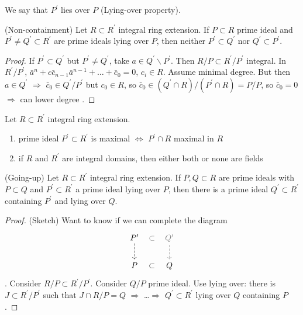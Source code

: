 \documentclass[a4paper,11pt]{article}
\begin{document}
			We say that $P^\prime$ lies over $P$ (Lying-over property).

			\begin{prop}(Non-containment)
				Let $R\subset R^\prime$ integral ring extension. If $P\subset R$ prime ideal and $P^\prime\neq Q^\prime\subset R^\prime$ are prime ideals lying over $P$, then neither $P^\prime\subset Q^\prime$ nor $Q^\prime\subset P^\prime$.
			\end{prop}
			\begin{proof}
				If $P^\prime\subset Q^\prime$ but $P^\prime\neq Q^\prime$, take $a\in Q^\prime\backslash P^\prime$. Then $R/P\subset R^\prime/P^\prime$ integral. In $R^\prime/P^\prime$, $\bar{a}^n+c\bar{c}_{n-1}\bar{a}^{n-1}+\dots+\bar{c}_0=0$, $c_i\in R$. Assume minimal degree. But then $a\in Q^\prime$ $\Longrightarrow$ $\bar{c}_0\in Q^\prime/P^\prime$ but $c_0\in R$, so $\bar{c}_0\in(Q^\prime\cap R)/(P^\prime\cap R)=P/P$, so $\bar{c}_0=0$ $\Longrightarrow$ can lower degree \contradiction.
			\end{proof}

			\begin{cor}
				Let $R\subset R^\prime$ integral ring extension.
				\begin{enumerate}
					\item prime ideal $P^\prime\subset R^\prime$ is maximal $\Longleftrightarrow$ $P^\prime\cap R$ maximal in $R$
					\item if $R$ and $R^\prime$ are integral domains, then either both or none are fields
				\end{enumerate}
			\end{cor}

			\begin{prop}\label{prop--existq}(Going-up)
				Let $R\subset R^\prime$ integral ring extension. If $P,Q\subset R$ are prime ideals with $P\subset Q$ and $P^\prime\subset R^\prime$ a prime ideal lying over $P$, then there is a prime ideal $Q^\prime\subset R^\prime$ containing $P^\prime $ and lying over $Q$.
			\end{prop}
			\begin{proof}\renewcommand{\qedsymbol}{}
				(Sketch) Want to know if we can complete the diagram 
				\begin{equation*}
					\begin{tikzcd}
						P^\prime\ar[d,dashed] \ar[r,phantom, "\rotatebox{180}{$\supset$}", description,gray] & {\color{gray}Q^\prime}\ar[d,dashed,gray]\\
						P\ar[r,phantom, "\rotatebox{180}{$\supset$}", description] & Q
					\end{tikzcd}
				\end{equation*}.
				Consider $R/P\subset R^\prime/P^\prime$. Consider $Q/P$ prime ideal. Use lying over: there is $J\subset R^\prime/P^\prime$ such that $J\cap R/P=Q$ $\Longrightarrow$ \dots $\Longrightarrow$ $Q^\prime\subset R^\prime$ lying over $Q$ containing $P$.
			\end{proof}\renewcommand{\qedsymbol}{$\square$}
\end{document}
